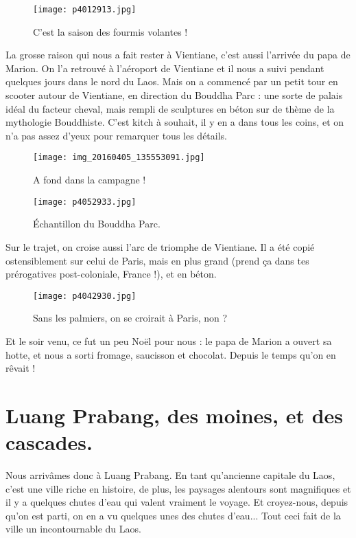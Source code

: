 \documentclass{book}
\begin{document}
\begin{figure}[h]
\centering
\texttt{[image: p4012913.jpg]}
\caption*{C'est la saison des fourmis volantes !}
\end{figure}

La grosse raison qui nous a fait rester à Vientiane, c'est aussi l'arrivée du papa de Marion. On l'a retrouvé à l'aéroport de Vientiane et il nous a suivi pendant quelques jours dans le nord du Laos. Mais on a commencé par un petit tour en scooter autour de Vientiane, en direction du Bouddha Parc : une sorte de palais idéal du facteur cheval, mais rempli de sculptures en béton sur de thème de la mythologie Bouddhiste. C'est kitch à souhait, il y en a dans tous les coins, et on n'a pas assez d'yeux pour remarquer tous les détails.


\begin{figure}[h]
\centering
\texttt{[image: img\_20160405\_135553091.jpg]}
\caption*{A fond dans la campagne !}
\end{figure}


\begin{figure}[h]
\centering
\texttt{[image: p4052933.jpg]}
\caption*{Échantillon du Bouddha Parc.}
\end{figure}

Sur le trajet, on croise aussi l'arc de triomphe de Vientiane. Il a été copié ostensiblement sur celui de Paris, mais en plus grand (prend ça dans tes prérogatives post-coloniale, France !), et en béton.


\begin{figure}[h]
\centering
\texttt{[image: p4042930.jpg]}
\caption*{Sans les palmiers, on se croirait à Paris, non ?}
\end{figure}

Et le soir venu, ce fut un peu Noël pour nous : le papa de Marion a ouvert sa hotte, et nous a sorti fromage, saucisson et chocolat. Depuis le temps qu'on en rêvait !





\chapter{Luang Prabang, des moines, et des cascades.}
Nous arrivâmes donc à Luang Prabang. En tant qu'ancienne capitale du Laos, c'est une ville riche en histoire, de plus, les paysages alentours sont magnifiques et il y a quelques chutes d'eau qui valent vraiment le voyage. Et croyez-nous, depuis qu'on est parti, on en a vu quelques unes des chutes d'eau... Tout ceci fait de la ville un incontournable du Laos.
\end{document}
